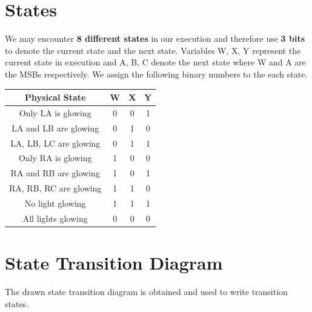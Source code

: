 \documentclass[12pt, letterpaper]{report}
\begin{document}
 

 
\section{States}
 
We may encounter \textbf{8 different states} in our execution and therefore use \textbf{3 bits} to denote the current state and the next state. Variables W, X, Y represent the current state in execution and A, B, C denote the next state where W and A are the MSBs respectively. We assign the following binary numbers to the each state. 
\\ 
 


\begin{center}
 \begin{tabular}{||c c c c||} 
 \hline\hline
 Physical State & W & X & Y \\  [0.5ex] 
 \hline\hline\hline
 Only LA is glowing & 0 & 0 & 1 \\ 
 \hline
 LA and LB are glowing & 0 & 1 & 0 \\
 \hline
 LA, LB, LC are glowing & 0 & 1 & 1 \\
 \hline\hline
  Only RA is glowing & 1 & 0 & 0 \\ 
 \hline
 RA and RB are glowing & 1 & 0 & 1 \\
 \hline
 RA, RB, RC are glowing & 1 & 1 & 0 \\
 \hline\hline
 No light glowing & 1 & 1 & 1 \\
 \hline\hline
 All lights glowing & 0 & 0 & 0 \\ [1ex] 
 \hline\hline

\end{tabular}

\end{center}





\section{State Transition Diagram}
The drawn state transition diagram is obtained and used to write transition states. 
 \\ \\ \\ \\ \\ \\ \\ \\ \\ \\ \\ \\
\end{document}
